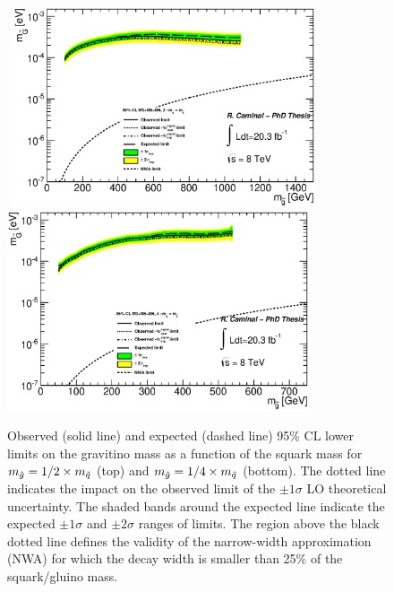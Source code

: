 \begin{figure}[!ht]
\begin{center}
\mbox{
\includegraphics[width=0.795\textwidth]{Interpretations/Figures/ModelIndependentGravitino_combined_mGLimit_Stop_A4_A9_A10mq2mg.eps}
}
\mbox{
\includegraphics[width=0.795\textwidth]{Interpretations/Figures/ModelIndependentGravitino_combined_mGLimit_Stop_A4_A9_A10mq4mg.eps}
}
\end{center}
\caption[95\% CL lower limits on the gravitino mass as a function of the squark mass for $m_{\gluino} = 1/2 \times m_{\squark}$ and $m_{\gluino} = 1/4 \times m_{\squark}$.]{Observed (solid line) and expected (dashed line) 95\% CL lower limits on the gravitino mass as a function of the squark mass for $m_{\gluino} = 1/2 \times m_{\squark}$ (top) and $m_{\gluino} = 1/4 \times m_{\squark}$ (bottom). The dotted line indicates the impact on the observed limit of the $\pm1\sigma$ LO theoretical uncertainty. The shaded bands around the expected line indicate the expected $\pm1\sigma$ and $\pm2\sigma$ ranges of limits. 
  The region above the black dotted line defines the validity of the narrow-width approximation (NWA) for which the decay width is smaller than 25\% of the squark/gluino mass.}
\label{fig:GravitinoMassExclusion_mqxmg}
\end{figure}

